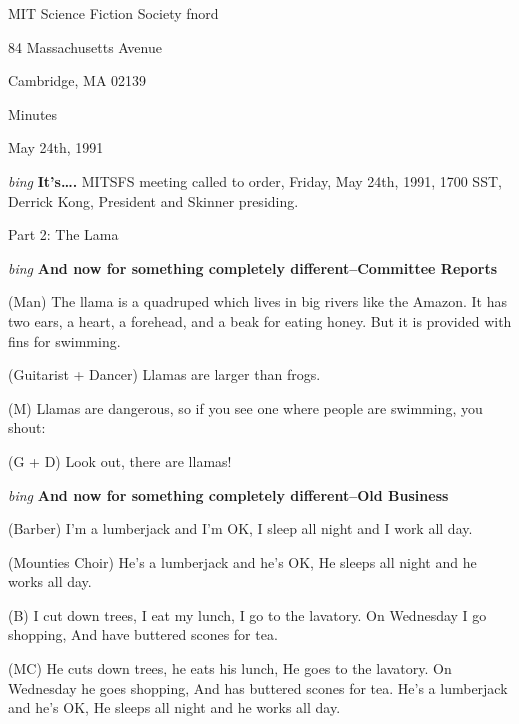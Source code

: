 \setlength{\topmargin}{-0.5in}
\setlength{\oddsidemargin}{0.0in}
\setlength{\evensidemargin}{0.0in}
\setlength{\textheight}{9in}
\setlength{\textwidth}{6.5in}



\begin{center}
MIT Science Fiction Society fnord

84 Massachusetts Avenue

Cambridge, MA 02139

\vspace{0.2in}
Minutes

May 24th, 1991

\end{center}
 
\vspace{0.15in}
{\em bing\/} {\bf It's\ldots{}.\/} MITSFS meeting called to order, Friday, May 24th, 1991,
1700 SST, Derrick Kong, President and Skinner presiding.

Part 2:  The Lama

\vspace{0.15in}
{\em bing\/} {\bf And now for something completely different--Committee Reports\/}

(Man) The llama is a quadruped which lives in big rivers like the
Amazon.  It has two ears, a heart, a forehead, and a beak for eating
honey.  But it is provided with fins for swimming.

(Guitarist + Dancer) Llamas are larger than frogs.

(M) Llamas are dangerous, so if you see one where people are swimming,
you shout:

(G + D) Look out, there are llamas!

\vspace{0.15in}
{\em bing\/} {\bf And now for something completely different--Old Business\/}

(Barber) I'm a lumberjack and I'm OK,
I sleep all night and I work all day.

(Mounties Choir) He's a lumberjack and he's OK,
He sleeps all night and he works all day.

(B) I cut down trees, I eat my lunch,
I go to the lavatory.
On Wednesday I go shopping,
And have buttered scones for tea.

(MC) He cuts down trees, he eats his lunch,
He goes to the lavatory.
On Wednesday he goes shopping,
And has buttered scones for tea.
He's a lumberjack and he's OK,
He sleeps all night and he works all day.

